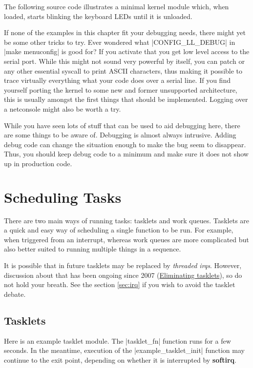 \documentclass[10pt, oneside]{book}
\begin{document}
The following source code illustrates a minimal kernel module which, when loaded, starts blinking the keyboard LEDs until it is unloaded.


If none of the examples in this chapter fit your debugging needs, there might yet be some other tricks to try.
Ever wondered what \cpp|CONFIG_LL_DEBUG| in \sh|make menuconfig| is good for?
If you activate that you get low level access to the serial port.
While this might not sound very powerful by itself, you can patch  or any other essential syscall to print ASCII characters, thus making it possible to trace virtually everything what your code does over a serial line.
If you find yourself porting the kernel to some new and former unsupported architecture, this is usually amongst the first things that should be implemented.
Logging over a netconsole might also be worth a try.

While you have seen lots of stuff that can be used to aid debugging here, there are some things to be aware of. Debugging is almost always intrusive.
Adding debug code can change the situation enough to make the bug seem to disappear.
Thus, you should keep debug code to a minimum and make sure it does not show up in production code.

\section{Scheduling Tasks}
\label{sec:scheduling_tasks}
There are two main ways of running tasks: tasklets and work queues.
Tasklets are a quick and easy way of scheduling a single function to be run.
For example, when triggered from an interrupt, whereas work queues are more complicated but also better suited to running multiple things in a sequence.

It is possible that in future tasklets may be replaced by \textit{threaded irqs}.
However, discussion about that has been ongoing since 2007 (\href{https://lwn.net/Articles/239633}{Eliminating tasklets}), so do not hold your breath.
See the section \ref{sec:irq} if you wish to avoid the tasklet debate.

\subsection{Tasklets}
\label{sec:tasklet}
Here is an example tasklet module.
The \cpp|tasklet_fn| function runs for a few seconds.
In the meantime, execution of the \cpp|example_tasklet_init| function may continue to the exit point, depending on whether it is interrupted by \textbf{softirq}.
\end{document}
